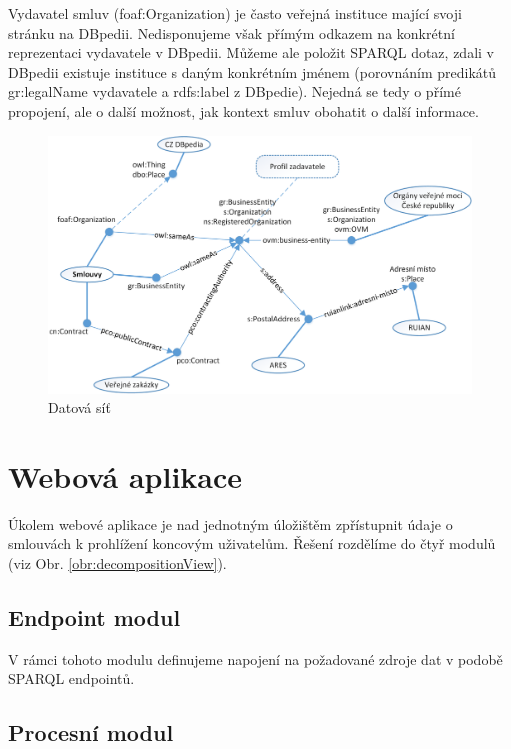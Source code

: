 Vydavatel smluv (foaf:Organization) je často veřejná instituce mající svoji stránku na DBpedii. Nedisponujeme však přímým odkazem na konkrétní reprezentaci vydavatele v DBpedii. Můžeme ale položit SPARQL dotaz, zdali v DBpedii existuje instituce s daným konkrétním jménem (porovnáním predikátů gr:legalName vydavatele a rdfs:label z DBpedie). Nejedná se tedy o přímé propojení, ale o další možnost, jak kontext smluv obohatit o další informace.

\begin{figure}[H]
\centerline{\includegraphics[width=\textwidth]{img/architectureLinks.eps}}
\caption{Datová síť}
\label{obr:architectureLinks}
\end{figure}

\section{Webová aplikace}

Úkolem webové aplikace je nad jednotným úložištěm zpřístupnit údaje o smlouvách k prohlížení koncovým uživatelům. Řešení rozdělíme do čtyř modulů (viz Obr. \ref{obr:decompositionView}).

\subsection*{Endpoint modul}

V rámci tohoto modulu definujeme napojení na požadované zdroje dat v podobě SPARQL endpointů.

\subsection*{Procesní modul}

